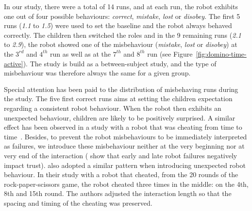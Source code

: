 \documentclass{sig-alternate}
\begin{document}
In our study, there were a total of 14 runs, and at each run, the robot exhibits
one out of four possible behaviours: \emph{correct}, \emph{mistake}, \emph{lost}
or \emph{disobey}.  The first 5 runs (\emph{1.1} to \emph{1.5}) were used to set
the baseline and the robot always behaved correctly. The children then switched
the roles and in the 9 remaining runs (\emph{2.1} to \emph{2.9}), the robot
showed one of the misbehaviour (\emph{mistake}, \emph{lost} or \emph{disobey})
at the $3^{rd}$ and $4^{th}$ run as well as at the $7^{th}$ and $8^{th}$ run
(see Figure~\ref{fig:domino-time-active}). The study is build as a
between-subject study, and the type of misbehaviour was therefore always the
same for a given group.

Special attention has been paid to the distribution of misbehaving runs during
the study. The five first correct runs aims at setting the children expectation
regarding a consistent robot behaviour. When the robot then exhibits an
unexpected behaviour, children are likely to be positively surprised. A similar
effect has been observed in a study with a robot that was cheating from time to
time~\cite{short_no_2010}.  Besides, to prevent the robot misbehaviours to be
immediately interpreted as failures, we introduce these misbehaviour neither at
the very beginning nor at very end of the interaction
(\cite{desai_effects_2012,desai_impact_2013} show that early and late robot
failures negatively impact trust). \cite{short_no_2010} also adopted a similar
pattern when introducing unexpected robot behaviour. In their study with a robot
that cheated, from the 20 rounds of the rock-paper-scissors game, the robot
cheated three times in the middle: on the 4th, 8th and 15th round. The authors
adjusted the interaction length so that the spacing and timing of the cheating
was preserved.
\end{document}
